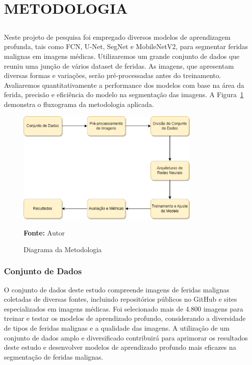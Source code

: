 \section{METODOLOGIA}

\subsection{}

    Neste projeto de pesquisa foi empregado diversos modelos de aprendizagem profunda, tais como \ac{FCN}, \ac{U-Net}, \ac{SegNet} e \ac{MobileNetV2}, para segmentar feridas malignas em imagens médicas. Utilizaremos um grande conjunto de dados que reuniu uma junção de vários dataset de feridas. As imagens, que apresentam diversas formas e variações, serão pré-processadas antes do treinamento. Avaliaremos quantitativamente a performance dos modelos com base na área da ferida, precisão e eficiência do modelo na segmentação das imagens. A Figura~\ref{fig:diagrama} demonstra o fluxograma da metodologia aplicada.

    \begin{figure}[htbp]
        \centering
        \caption{Diagrama da Metodologia}
        \includegraphics[width=0.8\textwidth]{img/Diagrama.png}
        \label{fig:diagrama}
        \par\medskip\textbf{Fonte:} Autor
    \end{figure}

    \subsubsection{Conjunto de Dados}
        O conjunto de dados deste estudo compreende imagens de feridas malignas coletadas de diversas fontes, incluindo repositórios públicos no GitHub e sites especializados em imagens médicas. Foi selecionado mais de 4.800 imagens para treinar e testar os modelos de aprendizado profundo, considerando a diversidade de tipos de feridas malignas e a qualidade das imagens. A utilização de um conjunto de dados amplo e diversificado contribuirá para aprimorar os resultados deste estudo e desenvolver modelos de aprendizado profundo mais eficazes na segmentação de feridas malignas.
        
